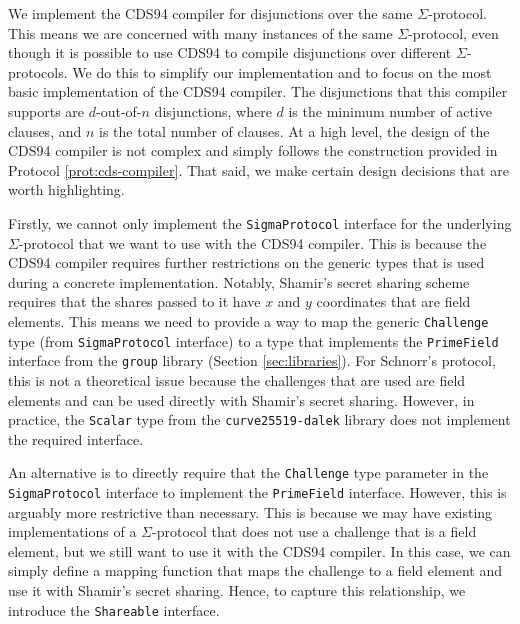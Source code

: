 We implement the CDS94 compiler for disjunctions over the same $\Sigma$-protocol. This means we are concerned 
with many instances of the same $\Sigma$-protocol, even though it is possible to use CDS94 to compile 
disjunctions over different $\Sigma$-protocols. We do this to simplify our implementation and to focus on the 
most basic implementation of the CDS94 compiler. The disjunctions that this compiler supports are $d$-out-of-$n$
disjunctions, where $d$ is the minimum number of active clauses, and $n$ is the total number of clauses.
At a high level, the design of the CDS94 compiler is not complex and simply follows the construction provided 
in Protocol \ref{prot:cds-compiler}. That said, we make certain design decisions that are worth highlighting.

Firstly, we cannot only implement the \texttt{SigmaProtocol} interface for the underlying $\Sigma$-protocol
that we want to use with the CDS94 compiler.
This is because the CDS94 compiler requires further restrictions on the generic 
types that is used during a concrete implementation. Notably, Shamir's secret sharing scheme requires that 
the shares passed to it have $x$ and $y$ coordinates that are field elements. This means we need to 
provide a way to map the generic \texttt{Challenge} type (from \texttt{SigmaProtocol} interface) to a 
type that implements the \texttt{PrimeField} interface from the \texttt{group} library (Section \ref{sec:libraries}).
For Schnorr's protocol, this is not a theoretical issue because the challenges that are used are field elements
and can be used directly with Shamir's secret sharing. However, in practice, the \texttt{Scalar} type from the
\texttt{curve25519-dalek} library does not implement the required interface. 

An alternative is to directly require that the \texttt{Challenge}
type parameter in the \texttt{SigmaProtocol} interface to implement the \texttt{PrimeField} interface. However,
this is arguably more restrictive than necessary. This is because we may have existing implementations of a 
$\Sigma$-protocol that does not use a challenge that is a field element, but we still want to use it with the
CDS94 compiler. In this case, we can simply define a mapping function that maps the challenge to a field element
and use it with Shamir's secret sharing. 
Hence, to capture this relationship, we introduce the \texttt{Shareable} interface.

